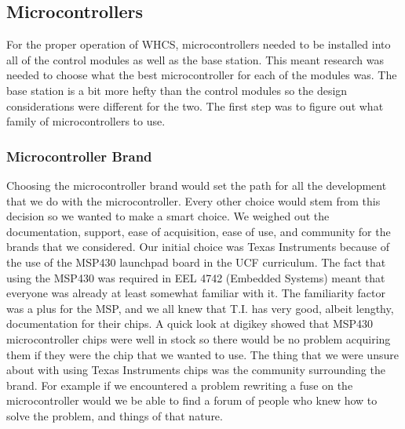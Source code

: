 
\subsection{Microcontrollers}
For the proper operation of WHCS, microcontrollers needed to be installed
into all of the control modules as well as the base station. This meant
research was needed to choose what the best microcontroller for each of the
modules was.  The base station is a bit more hefty than the control modules so
the design considerations were different for the two.  The first step was to
figure out what family of microcontrollers to use.

\subsubsection{Microcontroller Brand}
Choosing the microcontroller brand would set the path for all the development
that we do with the microcontroller. Every other choice would stem from this
decision so we wanted to make a smart choice. We weighed out the documentation,
support, ease of acquisition, ease of use, and community for the brands that we
considered. Our initial choice was Texas Instruments because of the use of the
MSP430 launchpad board in the UCF curriculum. The fact that using the MSP430
was required in EEL 4742 (Embedded Systems) meant that everyone was already at
least somewhat familiar with it.  The familiarity factor was a plus for the
MSP, and we all knew that T.I. has very good, albeit lengthy, documentation for
their chips. A quick look at digikey showed that MSP430 microcontroller chips
were well in stock so there would be no problem acquiring them if they were the
chip that we wanted to use. The thing that we were unsure about with using
Texas Instruments chips was the community surrounding the brand. For example if
we encountered a problem rewriting a fuse on the microcontroller would we be
able to find a forum of people who knew how to solve the problem, and things of
that nature.

